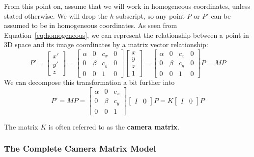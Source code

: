 \documentclass[a4paper, 12pt]{article}
\renewcommand\emph{\textbf}
\begin{document}
From this point on, assume that we will work in homogeneous coordinates, unless stated otherwise. We will drop the $h$ subscript, so any point $P$ or $P'$ can be assumed to be in homogeneous coordinates. As seen from Equation~\ref{eq:homogeneous}, we can represent the relationship between a point in 3D space and its image coordinates by a matrix vector relationship:
\begin{equation}
    P' = \begin{bmatrix}x'\\y'\\ z\end{bmatrix}=\begin{bmatrix}
    \alpha & 0 & c_x & 0\\
    0 & \beta & c_y & 0 \\ 
    0 & 0 & 1 & 0
    \end{bmatrix}\begin{bmatrix}x\\y\\z\\1\end{bmatrix}=
    \begin{bmatrix}
    \alpha & 0 & c_x & 0\\
    0 & \beta & c_y & 0 \\ 
    0 & 0 & 1 & 0
    \end{bmatrix}P = MP 
    \label{eq:canonical}
\end{equation}
We can decompose this transformation a bit further into 
\begin{equation}
P' = MP = \begin{bmatrix}
    \alpha & 0 & c_x \\
    0 & \beta & c_y  \\ 
    0 & 0 & 1 
    \end{bmatrix}\begin{bmatrix}I & 0\end{bmatrix}P = K\begin{bmatrix}I & 0\end{bmatrix}P
    \label{eq:decomposedHomogenousTransform}
\end{equation}

The matrix $K$ is often referred to as the \emph{camera matrix}. 

\subsubsection{The Complete Camera Matrix Model}
\end{document}

